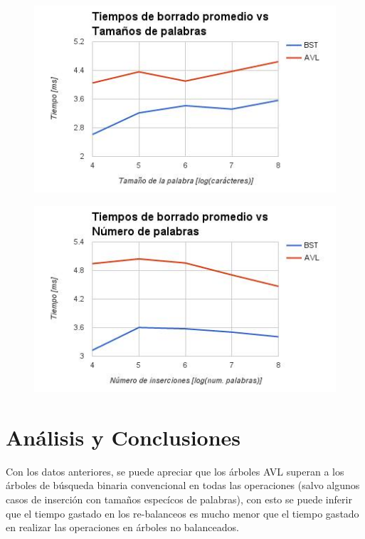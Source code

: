 \documentclass[12pt,letterpaper,hidelinks]{extarticle}
\begin{document}
\newpage

	\begin{figure}[ht!]
		\centering \includegraphics[scale=0.8]{img/del-size.jpg}
	\end{figure}

	\begin{figure}[ht!]
		\centering \includegraphics[scale=0.8]{img/del-num.jpg}
	\end{figure}

\newpage
\section{Análisis y Conclusiones}
		Con los datos anteriores, se puede apreciar que los árboles AVL superan a los árboles de búsqueda binaria convencional en todas las
		operaciones (salvo algunos casos de inserción con tamaños especícos de palabras), con esto se puede inferir que el tiempo gastado
		en los re-balanceos es mucho menor que el tiempo gastado en realizar las operaciones en árboles no balanceados.
\newpage


%
%
%
\end{document}

